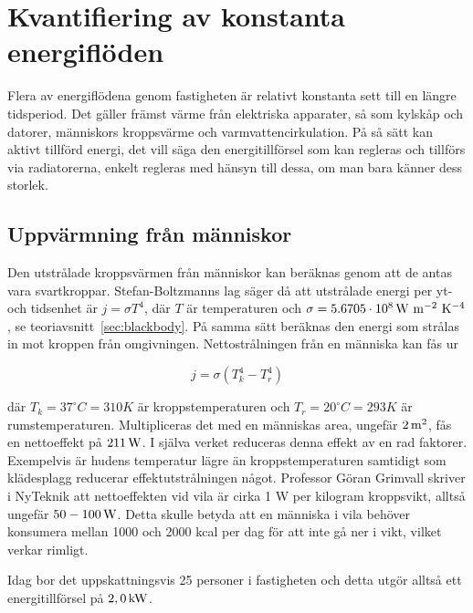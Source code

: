 \section{Kvantifiering av konstanta energiflöden}
\label{sec:constsources}


Flera av energiflödena genom fastigheten är relativt konstanta sett till en längre tidsperiod. Det gäller främst värme från elektriska apparater, så som kylskåp och datorer, människors kroppsvärme och varmvattencirkulation. På så sätt kan aktivt tillförd energi, det vill säga den energitillförsel som kan regleras och tillförs via radiatorerna, enkelt regleras med hänsyn till dessa, om man bara känner dess storlek.

\subsection{Uppvärmning från människor}
Den utstrålade kroppsvärmen från människor kan beräknas genom att de antas vara svartkroppar. Stefan-Boltzmanns lag säger då att utstrålade energi per yt- och tidsenhet är $j=\sigma T^4$, där $T$ är temperaturen och $\sigma=\unit[5.6705\cdot 10^8]{W~m^{-2}~K^{-4}}$ \cite{physicshandbook}, se teoriavsnitt~\ref{sec:blackbody}. På samma sätt beräknas den energi som strålas in mot kroppen från omgivningen. Nettostrålningen från en människa kan fås ur

\begin{equation}
\label{eq:constantsources:stefan}
j=\sigma \left( T_k^4 - T_r^4 \right)
\end{equation}
\noindent

där $T_k=37^{\circ}C=310K$ är kroppstemperaturen och $T_r=20^{\circ}C=293K$ är rumstemperaturen. Multipliceras det med en människas area, ungefär $\unit[2]{m^2}$, fås en nettoeffekt på $\unit[211]{W}$. I själva verket reduceras denna effekt av en rad faktorer. Exempelvis är hudens temperatur lägre än kroppstemperaturen samtidigt som klädesplagg reducerar effektutstrålningen något. Professor Göran Grimvall skriver i NyTeknik att nettoeffekten vid vila är cirka 1 W per kilogram kroppsvikt, alltså ungefär $\unit[50-100]{W}$\cite{Grimvall}. Detta skulle betyda att en människa i vila behöver konsumera mellan 1000 och 2000 kcal per dag för att inte gå ner i vikt, vilket verkar rimligt.

Idag bor det uppskattningsvis 25 personer i fastigheten och detta utgör alltså ett energitillförsel på $\unit[2,0]{kW}$.

